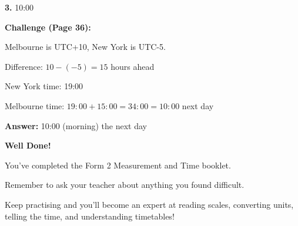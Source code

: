 \documentclass[12pt,a4paper]{article}
\begin{document}
\textbf{3.} 10:00

\textbf{Challenge (Page 36):}

Melbourne is UTC+10, New York is UTC-5.

Difference: $10 - (-5) = 15$ hours ahead

New York time: 19:00

Melbourne time: $19:00 + 15:00 = 34:00 = 10:00$ next day

\textbf{Answer:} 10:00 (morning) the next day

\vfill

\begin{center}
\begin{tcolorbox}[colback=successgreen!20,colframe=successgreen!80!black,width=12cm,arc=3mm]
\centering
\Large\textbf{Well Done!}

You've completed the Form 2 Measurement and Time booklet.

Remember to ask your teacher about anything you found difficult.

Keep practising and you'll become an expert at reading scales, converting units, telling the time, and understanding timetables!
\end{tcolorbox}
\end{center}
\end{document}

